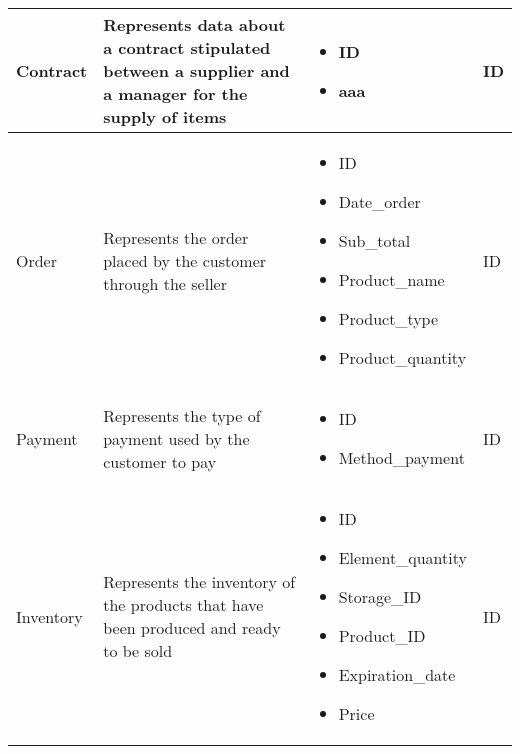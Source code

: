 \begin{longtable}{|p{}|p{} |p{}|p{} |}
    Contract & Represents data about a contract stipulated between a supplier and a manager for the supply of items &
    \begin{itemize}
        \vspace{-1em}
        \item ID
        \item aaa   %
    \end{itemize}
    &  ID\\\hline

    Order & Represents the order placed by the customer through the seller &
    \begin{itemize}
        \vspace{-1em}
        \item ID
        \item Date\_order
        \item Sub\_total
        \item Product\_name
        \item Product\_type
        \item Product\_quantity
    \end{itemize}
    &  ID\\\hline

    Payment & Represents the type of payment used by the customer to pay &
    \begin{itemize}
        \vspace{-1em}
        \item ID
        \item Method\_payment
    \end{itemize}
    &  ID\\\hline

    Inventory & Represents the inventory of the products that have been produced and ready to be sold &
    \begin{itemize}
        \vspace{-1em}
        \item ID
        \item Element\_quantity
        \item Storage\_ID
        \item Product\_ID
        \item Expiration\_date
        \item Price     %
    \end{itemize}
    &  ID \\\hline


\end{longtable}
